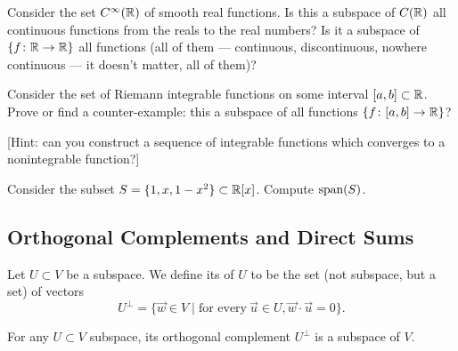 \begin{exercise}
Consider the set $C^{\infty}(\mathbb{R})$ of smooth real functions.
Is this a subspace of $C(\mathbb{R})$ all continuous functions from the reals
to the real numbers?
Is it a subspace of $\{f\colon\mathbb{R}\to\mathbb{R}\}$ all functions (all of them --- continuous,
discontinuous, nowhere continuous --- it doesn't matter, all of them)?
\end{exercise}

\begin{exercise}
Consider the set of Riemann integrable functions on some interval
$[a,b]\subset\mathbb{R}$. Prove or find a counter-example: this a subspace of all functions $\{f\colon[a,b]\to\mathbb{R}\}$?

[Hint: can you construct a sequence of integrable functions which
  converges to a nonintegrable function?]
\end{exercise}

\begin{exercise}
Consider the subset $S = \{1,x,1-x^{2}\}\subset\mathbb{R}[x]$. Compute $\operatorname{span}(S)$.
\end{exercise}

\subsection{Orthogonal Complements and Direct Sums}

\begin{definition}
Let $U\subset V$ be a subspace. We define its 
of $U$ to be the set (not subspace, but a set) of vectors
\begin{equation}
U^{\perp} = \{\vec{w}\in V\mid \mbox{for every}~\vec{u}\in U, \vec{w}\cdot\vec{u}=0\}.
\end{equation}
\end{definition}

\begin{proposition}
For any $U\subset V$ subspace, its orthogonal complement $U^{\perp}$ is
a subspace of $V$.
\end{proposition}

